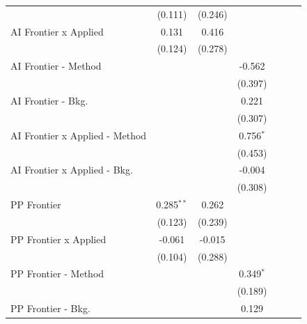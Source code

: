 \begin{tabular}{lcccccc}
                                  & (0.111)        & (0.246)       &             &       &       &   \\   
   AI Frontier x Applied          & 0.131          & 0.416         &             &       &       &   \\   
                                  & (0.124)        & (0.278)       &             &       &       &   \\   
   AI Frontier - Method           &                &               & -0.562      &       &       &   \\   
                                  &                &               & (0.397)     &       &       &   \\   
   AI Frontier - Bkg.             &                &               & 0.221       &       &       &   \\   
                                  &                &               & (0.307)     &       &       &   \\   
   AI Frontier x Applied - Method &                &               & 0.756$^{*}$ &       &       &   \\   
                                  &                &               & (0.453)     &       &       &   \\   
   AI Frontier x Applied - Bkg.   &                &               & -0.004      &       &       &   \\   
                                  &                &               & (0.308)     &       &       &   \\   
   PP Frontier                    & 0.285$^{**}$   & 0.262         &             &       &       &   \\   
                                  & (0.123)        & (0.239)       &             &       &       &   \\   
   PP Frontier x Applied          & -0.061         & -0.015        &             &       &       &   \\   
                                  & (0.104)        & (0.288)       &             &       &       &   \\   
   PP Frontier - Method           &                &               & 0.349$^{*}$ &       &       &   \\   
                                  &                &               & (0.189)     &       &       &   \\   
   PP Frontier - Bkg.             &                &               & 0.129       &       &       &   \\   

\end{tabular}
